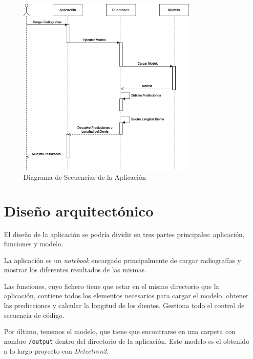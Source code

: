 \begin{figure}[h]
 \centering
  \includegraphics[width=0.8\textwidth]{img/DiagramaSecuencia.png}
 \caption{Diagrama de Secuencias de la Aplicación}
 \label{secuencia}
\end{figure}

\section{Diseño arquitectónico}
El diseño de la aplicación se podría dividir en tres partes principales: aplicación, funciones y modelo.

La aplicación es un \emph{notebook} encargado principalmente de cargar radiografías y mostrar los diferentes resultados de las mismas.

Las funciones, cuyo fichero tiene que estar en el mismo directorio que la aplicación, contiene todos los elementos necesarios para cargar el modelo, obtener las predicciones y calcular la longitud de los dientes. Gestiona todo el control de secuencia de código.

Por último, tenemos el modelo, que tiene que encontrarse en una carpeta con nombre \texttt{/output} dentro del directorio de la aplicación. Este modelo es el obtenido a lo largo proyecto con \emph{Detectron2}.
